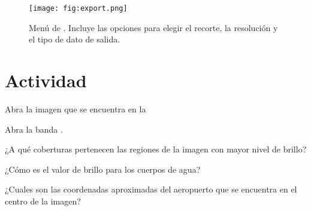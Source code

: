 \begin{figure}[h!]
    \centering
    \texttt{[image: fig:export.png]}
    \caption{Menú de . Incluye las opciones para elegir el recorte, la resolución y el tipo de dato de salida.}
    \label{fig:export}
\end{figure}

\section{Actividad}

Abra la imagen que se encuentra en la
\begin{center}
\end{center}
Abra la banda .

\begin{que}
    ¿A qué coberturas pertenecen las regiones de la imagen con mayor nivel de brillo?
\end{que}

\begin{que}
    ¿Cómo es el valor de brillo para los cuerpos de agua?
\end{que}

\begin{que}
    ¿Cuales son las coordenadas aproximadas del aeropuerto que se encuentra en el centro de la imagen?
\end{que}
